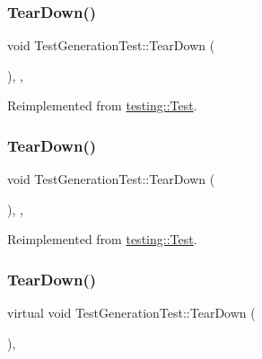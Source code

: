 \subsubsection{\texorpdfstring{TearDown()}{TearDown()}\hspace{0.1cm}{\footnotesize\ttfamily [1/3]}}
{\footnotesize\ttfamily void Test\+Generation\+Test\+::\+Tear\+Down (\begin{DoxyParamCaption}{ }\end{DoxyParamCaption})\hspace{0.3cm}{\ttfamily [inline]}, {\ttfamily [override]}, {\ttfamily [virtual]}}



Reimplemented from \mbox{\hyperlink{classtesting_1_1_test_a5f0ab439802cbe0ef7552f1a9f791923}{testing\+::\+Test}}.

\mbox{\label{class_test_generation_test_a7e6a732f786fe5b2d989c11c51eb9fe1}} 
\subsubsection{\texorpdfstring{TearDown()}{TearDown()}\hspace{0.1cm}{\footnotesize\ttfamily [2/3]}}
{\footnotesize\ttfamily void Test\+Generation\+Test\+::\+Tear\+Down (\begin{DoxyParamCaption}{ }\end{DoxyParamCaption})\hspace{0.3cm}{\ttfamily [inline]}, {\ttfamily [override]}, {\ttfamily [virtual]}}



Reimplemented from \mbox{\hyperlink{classtesting_1_1_test_a5f0ab439802cbe0ef7552f1a9f791923}{testing\+::\+Test}}.

\mbox{\label{class_test_generation_test_a447190a74b306b4b94c25fed474d6029}} 
\subsubsection{\texorpdfstring{TearDown()}{TearDown()}\hspace{0.1cm}{\footnotesize\ttfamily [3/3]}}
{\footnotesize\ttfamily virtual void Test\+Generation\+Test\+::\+Tear\+Down (\begin{DoxyParamCaption}{ }\end{DoxyParamCaption})\hspace{0.3cm}{\ttfamily [inline]}, {\ttfamily [virtual]}}



